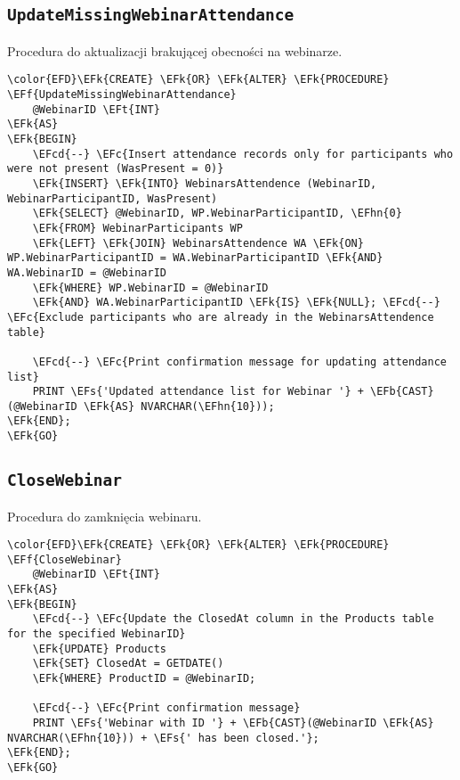 \documentclass[11pt]{article}
\newcommand{\EFc}[1]{\textcolor{EFc}{\textit{#1}}} %
\newcommand{\EFcd}[1]{\textcolor{EFcd}{\textit{#1}}} %
\newcommand{\EFs}[1]{\textcolor{EFs}{#1}} %
\newcommand{\EFk}[1]{\textcolor{EFk}{\textbf{#1}}} %
\newcommand{\EFb}[1]{\textcolor{EFb}{\textbf{#1}}} %
\newcommand{\EFf}[1]{\textcolor{EFf}{#1}} %
\newcommand{\EFt}[1]{\textcolor{EFt}{\textbf{#1}}} %
\newcommand{\EFhn}[1]{\textcolor{EFhn}{#1}} %
\begin{document}
\subsection{\texttt{UpdateMissingWebinarAttendance}}
\label{sec:orgf51b00c}
Procedura do aktualizacji brakującej obecności na webinarze.
\begin{Code}
\begin{Verbatim}
\color{EFD}\EFk{CREATE} \EFk{OR} \EFk{ALTER} \EFk{PROCEDURE} \EFf{UpdateMissingWebinarAttendance}
    @WebinarID \EFt{INT}
\EFk{AS}
\EFk{BEGIN}
    \EFcd{--} \EFc{Insert attendance records only for participants who were not present (WasPresent = 0)}
    \EFk{INSERT} \EFk{INTO} WebinarsAttendence (WebinarID, WebinarParticipantID, WasPresent)
    \EFk{SELECT} @WebinarID, WP.WebinarParticipantID, \EFhn{0}
    \EFk{FROM} WebinarParticipants WP
    \EFk{LEFT} \EFk{JOIN} WebinarsAttendence WA \EFk{ON} WP.WebinarParticipantID = WA.WebinarParticipantID \EFk{AND} WA.WebinarID = @WebinarID
    \EFk{WHERE} WP.WebinarID = @WebinarID
    \EFk{AND} WA.WebinarParticipantID \EFk{IS} \EFk{NULL}; \EFcd{--} \EFc{Exclude participants who are already in the WebinarsAttendence table}

    \EFcd{--} \EFc{Print confirmation message for updating attendance list}
    PRINT \EFs{'Updated attendance list for Webinar '} + \EFb{CAST}(@WebinarID \EFk{AS} NVARCHAR(\EFhn{10}));
\EFk{END};
\EFk{GO}
\end{Verbatim}
\end{Code}
\subsection{\texttt{CloseWebinar}}
\label{sec:orgf2c2992}
Procedura do zamknięcia webinaru.
\begin{Code}
\begin{Verbatim}
\color{EFD}\EFk{CREATE} \EFk{OR} \EFk{ALTER} \EFk{PROCEDURE} \EFf{CloseWebinar}
    @WebinarID \EFt{INT}
\EFk{AS}
\EFk{BEGIN}
    \EFcd{--} \EFc{Update the ClosedAt column in the Products table for the specified WebinarID}
    \EFk{UPDATE} Products
    \EFk{SET} ClosedAt = GETDATE()
    \EFk{WHERE} ProductID = @WebinarID;

    \EFcd{--} \EFc{Print confirmation message}
    PRINT \EFs{'Webinar with ID '} + \EFb{CAST}(@WebinarID \EFk{AS} NVARCHAR(\EFhn{10})) + \EFs{' has been closed.'};
\EFk{END};
\EFk{GO}
\end{Verbatim}
\end{Code}
\end{document}
